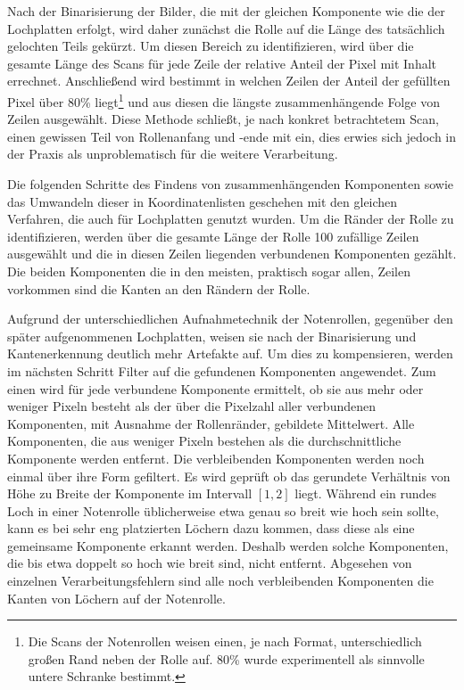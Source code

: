 Nach der Binarisierung der Bilder, die mit der gleichen Komponente wie die der Lochplatten erfolgt, wird daher zunächst die Rolle auf die Länge des tatsächlich gelochten Teils gekürzt.
Um diesen Bereich zu identifizieren, wird über die gesamte Länge des Scans für jede Zeile der relative Anteil der Pixel mit Inhalt errechnet.
Anschließend wird bestimmt in welchen Zeilen der Anteil der gefüllten Pixel über 80\% liegt\footnote{Die Scans der Notenrollen weisen einen, je nach Format, unterschiedlich großen Rand neben der Rolle auf. 80\% wurde experimentell als sinnvolle untere Schranke bestimmt.} und aus diesen die längste zusammenhängende Folge von Zeilen ausgewählt.
Diese Methode schließt, je nach konkret betrachtetem Scan, einen gewissen Teil von Rollenanfang und -ende mit ein, dies erwies sich jedoch in der Praxis als unproblematisch für die weitere Verarbeitung.

Die folgenden Schritte des Findens von zusammenhängenden Komponenten sowie das Umwandeln dieser in Koordinatenlisten geschehen mit den gleichen Verfahren, die auch für Lochplatten genutzt wurden.
Um die Ränder der Rolle zu identifizieren, werden über die gesamte Länge der Rolle 100 zufällige Zeilen ausgewählt und die in diesen Zeilen liegenden verbundenen Komponenten gezählt.
Die beiden Komponenten die in den meisten, praktisch sogar allen, Zeilen vorkommen sind die Kanten an den Rändern der Rolle.

Aufgrund der unterschiedlichen Aufnahmetechnik der Notenrollen, gegenüber den später aufgenommenen Lochplatten, weisen sie nach der Binarisierung und Kantenerkennung deutlich mehr Artefakte auf.
Um dies zu kompensieren, werden im nächsten Schritt Filter auf die gefundenen Komponenten angewendet.
Zum einen wird für jede verbundene Komponente ermittelt, ob sie aus mehr oder weniger Pixeln besteht als der über die Pixelzahl aller verbundenen Komponenten, mit Ausnahme der Rollenränder, gebildete Mittelwert.
Alle Komponenten, die aus weniger Pixeln bestehen als die durchschnittliche Komponente werden entfernt.
Die verbleibenden Komponenten werden noch einmal über ihre Form gefiltert.
Es wird geprüft ob das gerundete Verhältnis von Höhe zu Breite der Komponente im Intervall $[1,2]$ liegt.
Während ein rundes Loch in einer Notenrolle üblicherweise etwa genau so breit wie hoch sein sollte, kann es bei sehr eng platzierten Löchern dazu kommen, dass diese als eine gemeinsame Komponente erkannt werden.
Deshalb werden solche Komponenten, die bis etwa doppelt so hoch wie breit sind, nicht entfernt.
Abgesehen von einzelnen Verarbeitungsfehlern sind alle noch verbleibenden Komponenten die Kanten von Löchern auf der Notenrolle.

